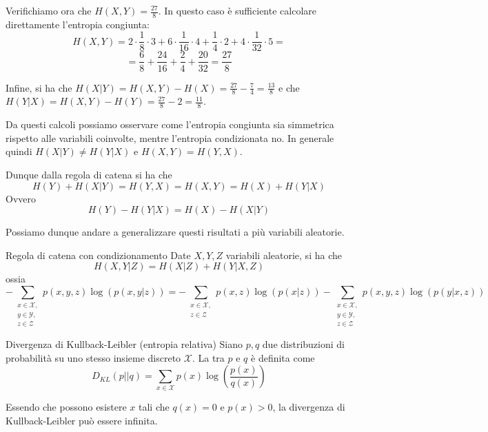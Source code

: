 \begin{example}{}
  Verifichiamo ora che \(H(X,Y) = \frac{27}{8}\).
  In questo caso è sufficiente calcolare direttamente l'entropia congiunta:
  \[H(X,Y) = 2\cdot\frac{1}{8}\cdot 3 + 6\cdot\frac{1}{16}\cdot 4 + \frac{1}{4}\cdot 2 + 4 \cdot \frac{1}{32}\cdot 5= \]
  \[= \frac{6}{8} + \frac{24}{16} + \frac{2}{4} + \frac{20}{32} = \frac{27}{8}\]
  

  Infine, si ha che \(H(X|Y) = H(X,Y)-H(X) = \frac{27}{8} - \frac{7}{4} = \frac{13}{8}\) e che \(H(Y|X) = H(X,Y)-H(Y) = \frac{27}{8} - 2 = \frac{11}{8}\).
\end{example}

Da questi calcoli possiamo osservare come l'entropia congiunta sia simmetrica rispetto alle variabili coinvolte, mentre l'entropia condizionata no.
In generale quindi \(H(X|Y) \neq H(Y|X)\) e \(H(X,Y) = H(Y,X)\).


Dunque dalla regola di catena si ha che
\[H(Y)+H(X|Y)=H(Y,X)=H(X,Y) = H(X)+H(Y|X)\]
Ovvero
\[H(Y) - H(Y|X) = H(X) - H(X|Y)\]

Possiamo dunque andare a generalizzare questi risultati a più variabili aleatorie.

\begin{proposition}{Regola di catena con condizionamento}
  Date \(X,Y,Z\) variabili aleatorie, si ha che
  \[H(X,Y|Z) = H(X|Z) + H(Y|X,Z)\]
  ossia
  \[- \sum_{\substack{x \in \mathcal{X},\\y\in\mathcal{Y},\\z \in \mathcal{Z}}} p(x,y,z) \log(p(x,y|z)) = -\sum_{\substack{x\in\mathcal{X},\\z\in\mathcal{Z}}} p(x,z)\log(p(x|z)) - \sum_{\substack{x \in \mathcal{X},\\y \in \mathcal{Y},\\z \in \mathcal{Z}}} p(x,y,z) \log(p(y|x,z))\]
\end{proposition}


\begin{definition}{Divergenza di Kullback-Leibler (entropia relativa)}
  Siano \(p,q\) due distribuzioni di probabilità su uno stesso insieme discreto \(\mathcal{X}\).
  La  tra \(p\) e \(q\) è definita come
  \[D_{KL}(p ||q) = \sum_{x \in \mathcal{X}} p(x) \log\left(\frac{p(x)}{q(x)}\right) \]
\end{definition}

\begin{note}{}
  Essendo che possono esistere \(x\) tali che \(q(x) = 0\) e \(p(x) > 0\), la divergenza di Kullback-Leibler può essere infinita.
\end{note}

